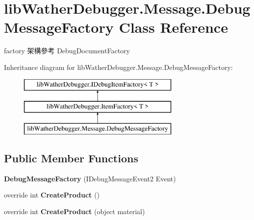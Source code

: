 \hypertarget{classlib_wather_debugger_1_1_message_1_1_debug_message_factory}{\section{lib\+Wather\+Debugger.\+Message.\+Debug\+Message\+Factory Class Reference}
\label{classlib_wather_debugger_1_1_message_1_1_debug_message_factory}
}


factory 架構參考 Debug\+Document\+Factory  


Inheritance diagram for lib\+Wather\+Debugger.\+Message.\+Debug\+Message\+Factory\+:\begin{figure}[H]
\begin{center}
\leavevmode
\includegraphics[height=3.000000cm]{classlib_wather_debugger_1_1_message_1_1_debug_message_factory}
\end{center}
\end{figure}
\subsection*{Public Member Functions}
\begin{DoxyCompactItemize}
\item 
\hypertarget{classlib_wather_debugger_1_1_message_1_1_debug_message_factory_a6cd6fe3ba724d5aca5882c37f2e6dfc8}{{\bfseries Debug\+Message\+Factory} (I\+Debug\+Message\+Event2 Event)}\label{classlib_wather_debugger_1_1_message_1_1_debug_message_factory_a6cd6fe3ba724d5aca5882c37f2e6dfc8}

\item 
\hypertarget{classlib_wather_debugger_1_1_message_1_1_debug_message_factory_aac3404efc69e1fb67b7fbec63da5e5df}{override int {\bfseries Create\+Product} ()}\label{classlib_wather_debugger_1_1_message_1_1_debug_message_factory_aac3404efc69e1fb67b7fbec63da5e5df}

\item 
\hypertarget{classlib_wather_debugger_1_1_message_1_1_debug_message_factory_a3177de9633a67c82c58bd23060f04001}{override int {\bfseries Create\+Product} (object material)}\label{classlib_wather_debugger_1_1_message_1_1_debug_message_factory_a3177de9633a67c82c58bd23060f04001}

\end{DoxyCompactItemize}

